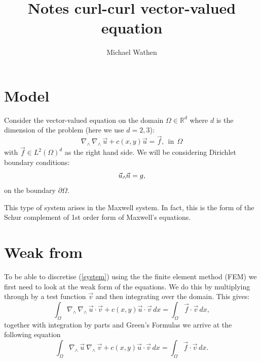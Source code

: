 \documentclass[14pt]{extarticle}
\numberwithin{equation}{section}    %
\newcommand{\curl}{\ensuremath{\nabla_{\wedge}\,}}
\renewcommand{\u}{\vec u}
\newcommand{\f}{\vec f}
\newcommand{\n}{\vec n}
\renewcommand{\v}{\vec v}
\begin{document}
\pagestyle{fancyplain}
\fancyhead{}
\fancyfoot{} %
\fancyfoot[LE,RO]{\thepage \hspace{-5mm}}
\fancyfoot[CO,RE]{}
\pagecolor{cyan}

\title{Notes curl-curl vector-valued equation}
\author{Michael Wathen}
\maketitle

\section{Model}

Consider the vector-valued equation on the domain $\Omega \in \mathbb{R}^d$ where $d$ is the dimension of the problem (here we use $d = 2,3$):
\begin{equation} \label{system}
    \curl \curl \u + c(x,y) \u = \f, \ \ \mbox{in} \ \ \Omega
\end{equation}
with $\f \in L^2 (\Omega)^d$ as the right hand side. We will be considering Dirichlet boundary conditions:
\begin{equation} \label{bc}
    \u_\wedge \hspace{-.2mm} \n = g,
\end{equation}
on the boundary $\partial \Omega$.

This type of system arises in the Maxwell system. In fact, this is the form of the Schur complement of 1st order form of Maxwell's equations.

\section{Weak from}

To be able to discretise (\ref{system}) using the the finite element method (FEM) we first need to look at the weak form of the equations. We do this by multiplying through by a test function $\v$ and then integrating over the domain. This gives:
$$  \int_\Omega \curl \curl \u \cdot \v + c(x,y) \u \cdot \v\, dx = \int_\Omega \f \cdot \v \, dx, $$
together with integration by parts and Green's Formulas we arrive at the following equation
\begin{equation} \label{weakform}
    \int_\Omega \curl \u \ \curl \v + c(x,y) \u \cdot \v\, dx = \int_\Omega \f \cdot \v \, dx.
\end{equation}
\end{document}
